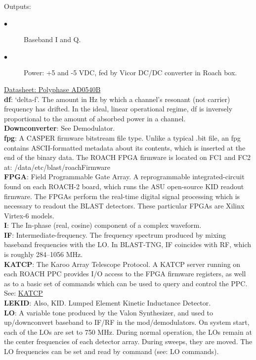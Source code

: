 Outputs:
\begin{description}
  \item[$\bullet$] Baseband I and Q.
  \item[$\bullet$] Power: +5 and -5 VDC, fed by Vicor DC/DC converter in Roach box.
\end{description}
\href{https://polyphasemicrowave.com/media/AD0540B.pdf}{Datasheet: Polyphase AD0540B}\\
\textbf{df}: ‘delta-f’. The amount in Hz by which a channel’s resonant (not carrier) frequency has drifted. In the ideal, linear operational regime, df is inversely proportional to the amount of absorbed power in a channel.\\
\textbf{Downconverter}: See Demodulator. \\
\textbf{fpg}: A CASPER firmware bitstream file type. Unlike a typical .bit file, an fpg contains ASCII-formatted metadata about its contents, which is inserted at the end of the binary data. The ROACH FPGA firmware is located on FC1 and FC2 at: /data/etc/blast/roachFirmware\\
\textbf{FPGA}: Field Programmable Gate Array. A reprogrammable integrated-circuit found on each ROACH-2 board, which runs the ASU open-source KID readout firmware. The FPGAs perform the real-time digital signal processing which is necessary to readout the BLAST detectors. These particular FPGAs are Xilinx Virtex-6 models.\\
\textbf{I}: The In-phase (real, cosine) component of a complex waveform.\\
\textbf{IF}: Intermediate-frequency. The frequency spectrum produced by mixing baseband frequencies with the LO. In BLAST-TNG, IF coincides with RF, which is roughly 284--1056 MHz.\\
\textbf{KATCP}: The Karoo Array Telescope Protocol. A KATCP server running on each ROACH PPC provides I/O access to the FPGA firmware registers, as well as to a basic set of commands which can be used to query and control the PPC.\\
See: \href{https://casper.ssl.berkeley.edu/wiki/KATCP}{KATCP}\\
\textbf{LEKID}: Also, KID. Lumped Element Kinetic Inductance Detector.\\
\textbf{LO}: A variable tone produced by the Valon Synthesizer, and used to up/downconvert baseband to IF/RF in the mod/demodulators. On system start, each of the LOs are set to 750 MHz. During normal operation, the LOs remain at the center frequencies of each detector array. During sweeps, they are moved. The LO frequencies can be set and read by command (see: LO commands).\\
